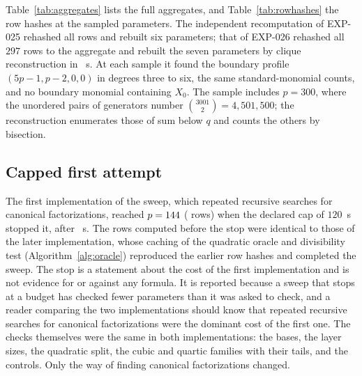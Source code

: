 \documentclass[11pt]{article}
\theoremstyle{definition}
\theoremstyle{remark}
\begin{document}
\begin{table}[ht]
\centering
\small

\caption{Size of the reduced Gr\"obner basis and the first sixteen hex digits of the row hash at
the seven parameters of the independent recomputation (computation EXP-026). The row hash is
the SHA-256 of the canonical JSON of the row, so a change of any entry of the row changes the
hash.}
\label{tab:rowhashes}
\end{table}

Table~\ref{tab:aggregates} lists the full aggregates, and Table~\ref{tab:rowhashes} the row hashes
at the sampled parameters. The independent recomputation of EXP-025 rehashed all rows and rebuilt
six parameters; that of EXP-026 rehashed all $297$ rows to the aggregate and rebuilt the seven
parameters by clique reconstruction in \ExpTwentySixAuditSeconds{}~s. At each sample it found the
boundary profile $(5p-1,p-2,0,0)$ in degrees three to six, the same standard-monomial counts,
and no boundary monomial containing $X_0$. The sample includes $p=300$, where the unordered pairs
of generators number $\binom{3001}{2}=4{,}501{,}500$; the reconstruction enumerates those of sum
below $q$ and counts the others by bisection.

\subsection{Capped first attempt}

The first implementation of the sweep, which repeated recursive searches for canonical
factorizations, reached $p=144$ (\FirstAttemptRows{} rows) when the declared cap of
$120$~s stopped it, after \FirstAttemptSeconds{}~s. The rows computed before the stop were
identical to those of the later implementation, whose caching of the quadratic oracle and
divisibility test (Algorithm~\ref{alg:oracle}) reproduced the earlier row hashes and completed
the sweep. The stop is a statement about the cost of the first implementation and is not
evidence for or against any formula. It is reported because a sweep that stops at a budget has
checked fewer parameters than it was asked to check, and a reader comparing the two
implementations should know that repeated recursive searches for canonical factorizations were
the dominant cost of the first one. The checks themselves were the same in both implementations:
the bases, the layer sizes, the quadratic split, the cubic and quartic families with their tails,
and the controls. Only the way of finding canonical factorizations changed.
\end{document}
